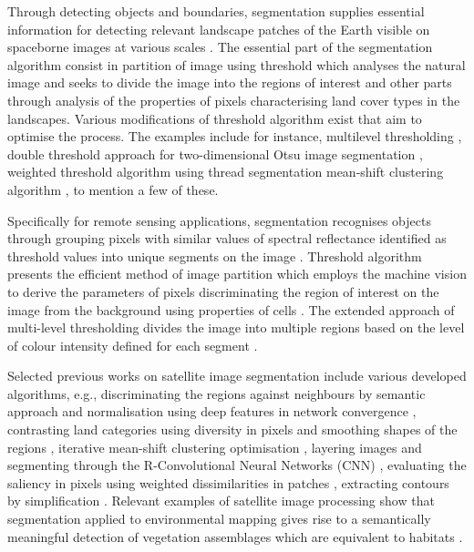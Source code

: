 \documentclass[analytics,article,submit,pdftex,moreauthors]{Definitions/mdpi}
\begin{document}
Through detecting objects and boundaries, segmentation supplies essential information for detecting relevant landscape patches of the Earth visible on spaceborne images at various scales \cite{Tzotsos}. The essential part of the segmentation algorithm consist in partition of image using threshold which analyses the natural image and seeks to divide the image into the regions of interest and other parts through analysis of the properties of pixels characterising land cover types in the landscapes. Various modifications of threshold algorithm exist that aim to optimise the process. The examples include for instance, multilevel thresholding \cite{9983775,8304271,8633236}, double threshold approach for two-dimensional Otsu image segmentation \cite{9421654,6066573}, weighted threshold algorithm using thread segmentation \cite{7493998} mean-shift clustering algorithm \cite{BARBATO2022100823}, to mention a few of these.

Specifically for remote sensing applications, segmentation recognises objects through grouping pixels with similar values of spectral reflectance identified as threshold values into unique segments on the image \cite{PAL20229964}. Threshold algorithm presents the efficient method of image partition which employs the machine vision to derive the parameters of pixels discriminating the region of interest on the image from the background using properties of cells \cite{6100288}. The extended approach of multi-level thresholding divides the image into multiple regions based on the level of colour intensity defined for each segment \cite{9244772,5721309,6755644}.

Selected previous works on satellite image segmentation include various developed algorithms, e.g., discriminating the regions against neighbours by semantic approach and normalisation using deep features in network convergence \cite{WANG2023108734}, contrasting land categories using diversity in pixels and smoothing shapes of the regions \cite{MAURYA2023102078}, iterative mean-shift clustering optimisation \cite{6351712}, layering images and segmenting through the R-Convolutional Neural Networks (CNN) \cite{8519391}, evaluating the saliency in pixels using weighted dissimilarities in patches \cite{6727739}, extracting contours by simplification \cite{WU20151133,8630683}. Relevant examples of satellite image processing show that segmentation applied to environmental mapping gives rise to a semantically meaningful detection of vegetation assemblages which are equivalent to habitats \cite{MUNYATI20131}. 
\end{document}
